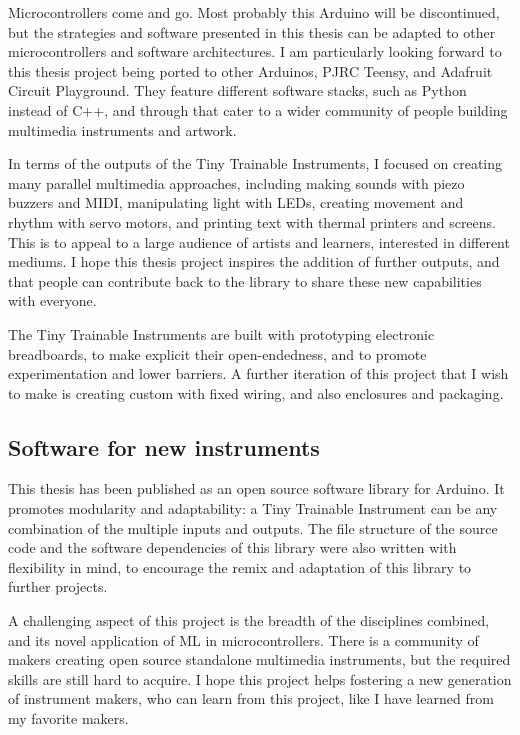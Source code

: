 Microcontrollers come and go. Most probably this Arduino will be discontinued, but the strategies and software presented in this thesis can be adapted to other microcontrollers and software architectures. I am particularly looking forward to this thesis project being ported to other Arduinos, PJRC Teensy, and Adafruit Circuit Playground. They feature different software stacks, such as Python instead of C++, and through that cater to a wider community of people building multimedia instruments and artwork.

In terms of the outputs of the Tiny Trainable Instruments, I focused on creating many parallel multimedia approaches, including making sounds with piezo buzzers and MIDI, manipulating light with LEDs, creating movement and rhythm with servo motors, and printing text with thermal printers and screens. This is to appeal to a large audience of artists and learners, interested in different mediums. I hope this thesis project inspires the addition of further outputs, and that people can contribute back to the library to share these new capabilities with everyone.

The Tiny Trainable Instruments are built with prototyping electronic breadboards, to make explicit their open-endedness, and to promote experimentation and lower barriers. A further iteration of this project that I wish to make is creating custom  with fixed wiring, and also enclosures and packaging.

\subsection{Software for new instruments}

This thesis has been published as an open source software library for Arduino. It promotes modularity and adaptability: a Tiny Trainable Instrument can be any combination of the multiple inputs and outputs. The file structure of the source code and the software dependencies of this library were also written with flexibility in mind, to encourage the remix and adaptation of this library to further projects.

A challenging aspect of this project is the breadth of the disciplines combined, and its novel application of \acrshort{ML} in microcontrollers. There is a community of makers creating open source standalone multimedia instruments, but the required skills are still hard to acquire. I hope this project helps fostering a new generation of instrument makers, who can learn from this project, like I have learned from my favorite makers.

